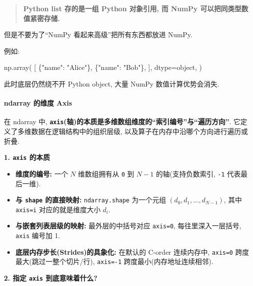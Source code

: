 \documentclass[11pt]{article}
\providecommand{\tightlist}{%
      \setlength{\itemsep}{0pt}\setlength{\parskip}{0pt}}
\newenvironment{Shaded}{}{}
\newcommand{\StringTok}[1]{\textcolor[rgb]{0.25,0.44,0.63}{{#1}}}
\newcommand{\NormalTok}[1]{{#1}}
\newcommand{\OperatorTok}[1]{\textcolor[rgb]{0.40,0.40,0.40}{{#1}}}
\newcommand{\BuiltInTok}[1]{{#1}}
\begin{document}
\begin{quote}
\textbf{Python list 存的是一组 Python 对象引用, 而 NumPy
可以把同类型数值紧密存储.}
\end{quote}

但是不要为了``NumPy 看起来高级''把所有东西都放进 NumPy.

例如:

\begin{Shaded}
\begin{Highlighting}[]
\NormalTok{np.array(}
\NormalTok{    [}
\NormalTok{        \{}\StringTok{"name"}\NormalTok{: }\StringTok{"Alice"}\NormalTok{\},}
\NormalTok{        \{}\StringTok{"name"}\NormalTok{: }\StringTok{"Bob"}\NormalTok{\},}
\NormalTok{    ],}
\NormalTok{    dtype}\OperatorTok{=}\BuiltInTok{object}\NormalTok{,}
\NormalTok{)}
\end{Highlighting}
\end{Shaded}

此时底层仍然绕不开 Python object, 大量 NumPy 数值计算优势会消失.

    \paragraph{ndarray 的维度 Axis}\label{ndarray-ux7684ux7ef4ux5ea6-axis}

    在 ndarray 中,
\textbf{\texttt{axis}(轴)的本质是多维数组维度的``索引编号''与``遍历方向''}.
它定义了多维数据在逻辑结构中的组织层级,
以及算子在内存中沿哪个方向进行遍历或折叠.

\textbf{1. \texttt{axis} 的本质}

\begin{itemize}
\tightlist
\item
  \textbf{维度的编号:} 一个 \(N\) 维数组拥有从 \texttt{0} 到 \(N-1\)
  的轴(支持负数索引, \texttt{-1} 代表最后一维).
\item
  \textbf{与 \texttt{shape} 的直接映射:} \texttt{ndarray.shape}
  为一个元组 \((d_0, d_1, \dots, d_{N-1})\), 其中 \texttt{axis=i}
  对应的就是维度大小 \(d_i\).
\item
  \textbf{与嵌套列表层级的映射:} 最外层的中括号对应 \texttt{axis=0},
  每往里深入一层括号, \texttt{axis} 编号加 1.
\item
  \textbf{底层内存步长(Strides)的具象化:} 在默认的 C-order 连续内存中,
  \texttt{axis=0} 跨度最大(跳过一整个切片/行), \texttt{axis=-1}
  跨度最小(内存地址连续相邻).
\end{itemize}

\textbf{2. 指定 \texttt{axis} 到底意味着什么?}
\end{document}
